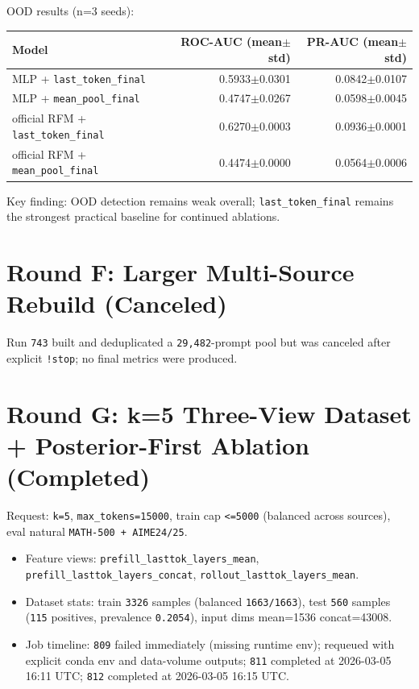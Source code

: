 \documentclass[11pt]{article}
\begin{document}
\noindent
OOD results (n=3 seeds):
\begin{center}
\begin{tabular}{@{}lrr@{}}
\toprule
Model & ROC-AUC (mean$\pm$std) & PR-AUC (mean$\pm$std) \\
\midrule
MLP + \texttt{last\_token\_final} & 0.5933$\pm$0.0301 & 0.0842$\pm$0.0107 \\
MLP + \texttt{mean\_pool\_final} & 0.4747$\pm$0.0267 & 0.0598$\pm$0.0045 \\
official RFM + \texttt{last\_token\_final} & 0.6270$\pm$0.0003 & 0.0936$\pm$0.0001 \\
official RFM + \texttt{mean\_pool\_final} & 0.4474$\pm$0.0000 & 0.0564$\pm$0.0006 \\
\bottomrule
\end{tabular}
\end{center}

\noindent
Key finding: OOD detection remains weak overall; \texttt{last\_token\_final} remains the strongest practical baseline for continued ablations.

\section*{Round F: Larger Multi-Source Rebuild (Canceled)}
Run \texttt{743} built and deduplicated a \texttt{29,482}-prompt pool but was canceled after explicit \texttt{!stop}; no final metrics were produced.

\section*{Round G: k=5 Three-View Dataset + Posterior-First Ablation (Completed)}
Request: \texttt{k=5}, \texttt{max\_tokens=15000}, train cap \texttt{<=5000} (balanced across sources), eval natural \texttt{MATH-500 + AIME24/25}.

\begin{itemize}
  \item Feature views: \texttt{prefill\_lasttok\_layers\_mean}, \texttt{prefill\_lasttok\_layers\_concat}, \texttt{rollout\_lasttok\_layers\_mean}.
  \item Dataset stats: train \texttt{3326} samples (balanced \texttt{1663/1663}), test \texttt{560} samples (\texttt{115} positives, prevalence \texttt{0.2054}), input dims mean=1536 concat=43008.
  \item Job timeline: \texttt{809} failed immediately (missing runtime env); requeued with explicit conda env and data-volume outputs; \texttt{811} completed at 2026-03-05 16:11 UTC; \texttt{812} completed at 2026-03-05 16:15 UTC.
\end{itemize}
\end{document}
